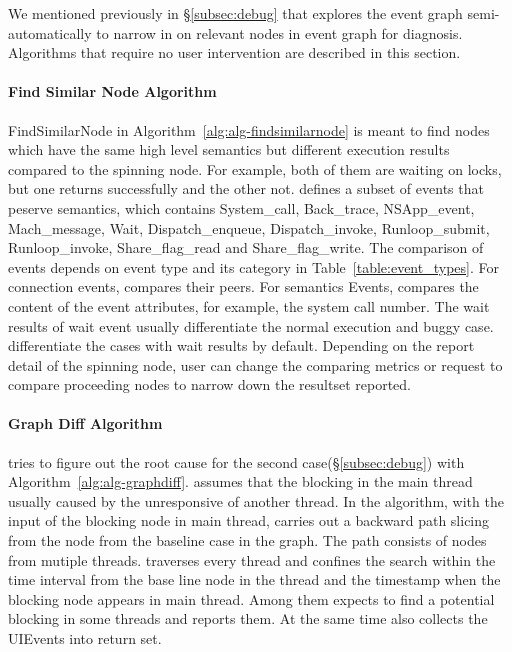 We mentioned previously in \S\ref{subsec:debug} that \xxx explores the event
graph semi-automatically to narrow in on relevant nodes in event graph for
diagnosis. Algorithms that require no user intervention are described
in this section.

\paragraph{Find Similar Node Algorithm}

FindSimilarNode in Algorithm~\ref{alg:alg-findsimilarnode} is meant to find
nodes which have the same high level semantics but different execution results
compared to the spinning node. For example, both of them are waiting on locks,
but one returns successfully and the other not. \xxx defines a subset of events
that peserve semantics, which contains System\_call, Back\_trace, NSApp\_event,
Mach\_message, Wait, Dispatch\_enqueue, Dispatch\_invoke, Runloop\_submit,
Runloop\_invoke, Share\_flag\_read and Share\_flag\_write. The comparison of
events depends on event type and its category in Table~\ref{table:event_types}.
For connection events, \xxx compares their peers. For semantics Events, \xxx
compares the content of the event attributes, for example, the system call
number. The wait results of wait event usually differentiate the normal
execution and buggy case. \xxx differentiate the cases with wait results by
default. Depending on the report detail of the spinning node, user can change
the comparing metrics or request \xxx to compare proceeding nodes to narrow down
the resultset reported.

\paragraph{Graph Diff Algorithm}

\xxx tries to figure out the root cause for the second
case(\S\ref{subsec:debug}) with Algorithm~\ref{alg:alg-graphdiff}. \xxx assumes
that the blocking in the main thread usually caused by the unresponsive of
another thread. In the algorithm, with the input of the blocking node in main
thread, \xxx carries out a backward path slicing from the node from the baseline
case in the graph. The path consists of nodes from mutiple threads. \xxx
traverses every thread and confines the search within the time interval from the
base line node in the thread and the timestamp when the blocking node appears
in main thread. Among them \xxx expects to find a potential blocking in some
threads and reports them. At the same time \xxx also collects the UIEvents into
return set.

